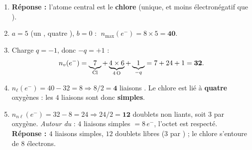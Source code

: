 \documentclass[11pt,a4paper]{article}
\newcommand{\nmax}{n_{\max}(e^-)}
\newcommand{\nv}{n_{v}(e^-)}
\newcommand{\nl}{n_{\ell}(e^-)}
\newcommand{\nnl}{n_{n\ell}(e^-)}
\newcommand{\rep}{\textbf{\textcolor{corcol}{Réponse : }}}
\begin{document}
\begin{cor}
\begin{enumerate}[label=\alph*),leftmargin=2em,itemsep=3pt]
  \item \rep l'atome central est le \textbf{chlore}  (unique, et moins électronégatif que
        ).
  \item $a=5$ (un , quatre ), $b=0$ : $\;\nmax = 8\times 5 = \mathbf{40}$.
  \item Charge $q=-1$, donc $-q=+1$ :
        \[ \nv = \underbrace{7}_{\ce{Cl}} + \underbrace{4\times 6}_{4\,\ce{O}} + \underbrace{1}_{-q}
           = 7 + 24 + 1 = \mathbf{32}. \]
  \item $\nl = 40 - 32 = 8 \Rightarrow 8/2 = \mathbf{4}$ liaisons . Le chlore est lié à
        \textbf{quatre} oxygènes : les $4$ liaisons sont donc \textbf{simples}.
  \item $\nnl = 32 - 8 = 24 \Rightarrow 24/2 = \mathbf{12}$ doublets non liants, soit $3$ par
        oxygène. \emph{Autour du } : $4$ liaisons simples $= 8\,e^-$, l'octet est
        respecté.\\
        \rep $4$ liaisons  simples, $12$ doublets libres ($3$ par ) ; le chlore
        s'entoure de $8$ électrons.
\end{enumerate}
\end{cor}
\end{document}
